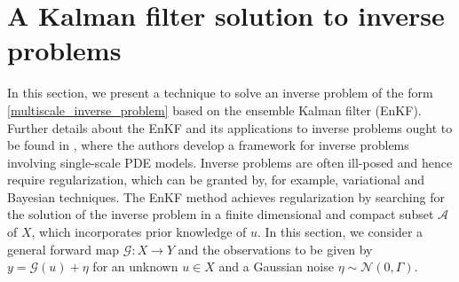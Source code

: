 \documentclass[10pt]{article}
\begin{document}
\section{A Kalman filter solution to inverse problems}\label{Kalman}

In this section, we present a technique to solve an inverse problem of the form \eqref{multiscale_inverse_problem} based on the ensemble Kalman filter (EnKF). Further details about the EnKF and its applications to inverse problems ought to be found in \cite{ILS13, ScS17}, where the authors develop a framework for inverse problems involving single-scale PDE models. Inverse problems are often ill-posed and hence require regularization, which can be granted by, for example, variational and Bayesian techniques. The EnKF method achieves regularization by searching for the solution of the inverse problem in a finite dimensional and compact subset $\mathcal{A}$ of $X$, which incorporates prior knowledge of $u$. In this section, we consider a general forward map $\mathcal G \colon X \to Y$ and the observations to be given by $y = \mathcal G(u) + \eta$ for an unknown $u \in X$ and a Gaussian noise $\eta \sim \mathcal N(0, \Gamma)$.
\end{document}
